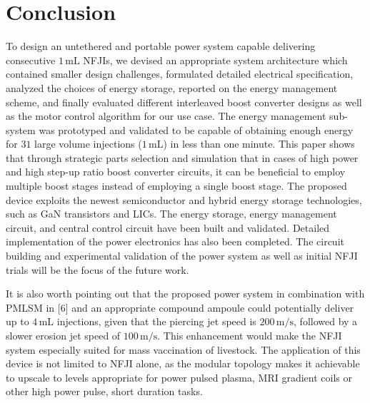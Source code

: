     
\section{Conclusion}

    To design an untethered and portable power system capable delivering consecutive $1\,\mathrm{mL}$ NFJIs, we devised an appropriate system architecture which contained smaller design challenges, formulated detailed electrical specification, analyzed the choices of energy storage, reported on the energy management scheme, and finally evaluated different interleaved boost converter designs as well as the motor control algorithm for our use case. The energy management sub-system was prototyped and validated to be capable of obtaining enough energy for $31$ large volume injections ($1\,\mathrm{mL}$) in less than one minute. This paper shows that through strategic parts selection and simulation that in cases of high power and high step-up ratio boost converter circuits, it can be beneficial to employ multiple boost stages instead of employing a single boost stage. The proposed device exploits the newest semiconductor and hybrid energy storage technologies, such as GaN transistors and LICs. The energy storage, energy management circuit, and central control circuit have been built and validated. Detailed implementation of the power electronics has also been completed. The circuit building and experimental validation of the power system as well as initial NFJI trials will be the focus of the future work.
    
    
    It is also worth pointing out that the proposed power system in combination with PMLSM in [6] and an appropriate compound ampoule \cite{Ruddy2015a} could potentially deliver up to $4\,\mathrm{mL}$ injections, given that the piercing jet speed is $200\,\mathrm{m/s}$, followed by a slower erosion jet speed of $100\,\mathrm{m/s}$. This enhancement would make the NFJI system especially suited for mass vaccination of livestock. The application of this device is not limited to NFJI alone, as the modular topology makes it achievable to upscale to levels appropriate for power pulsed plasma, MRI gradient coils \cite{Wang2017} or other high power pulse, short duration tasks.